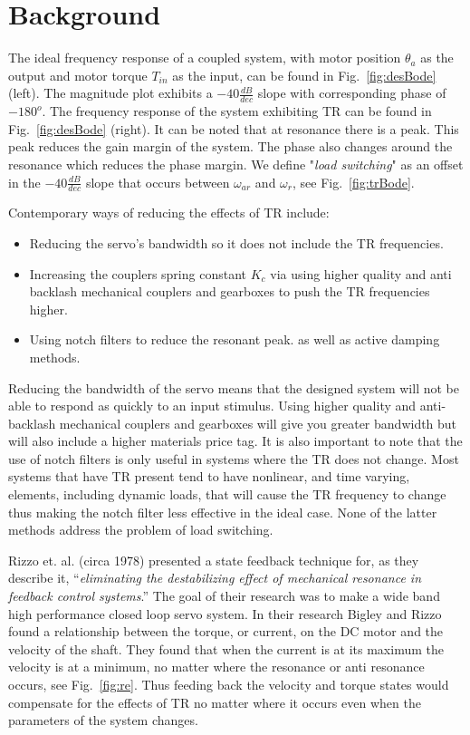 \section{Background}\label{sec:back}
The ideal frequency response of a coupled system, with motor position $\theta_a$ as the output and motor torque $T_{in}$ as the input, can be found in Fig.~\ref{fig:desBode} (left). 
The magnitude plot exhibits a $-40\frac{dB}{dec}$ slope with corresponding phase of $-180^o$.
The frequency response of the system exhibiting TR can be found in Fig.~\ref{fig:desBode} (right). 
It can be noted that at resonance there is a peak. This peak reduces the gain margin of the system. The phase also changes around the resonance which reduces the phase margin.  
We define "\textit{load switching}" as an offset in the $-40\frac{dB}{dec}$ slope that occurs between $\omega_{ar}$ and $\omega_r$, see Fig.~\ref{fig:trBode}.

Contemporary ways of reducing the effects of TR include:
\begin{itemize}
\item Reducing the servo's bandwidth so it does not include the TR frequencies. 
\item Increasing the couplers spring constant $K_c$ via using higher quality and anti backlash mechanical couplers and gearboxes to push the TR frequencies higher. 
\item Using notch filters to reduce the resonant peak. as well as active damping methods\cite{5730488}.   
\end{itemize}

Reducing the bandwidth of the servo means that the designed system will not be able to respond as quickly to an input stimulus. Using higher quality and anti-backlash mechanical couplers and gearboxes will give you greater bandwidth but will also include a higher materials price tag. It is also important to note that the use of notch filters is only useful in systems where the TR does not change. Most systems that have TR present tend to have nonlinear, and time varying, elements, including dynamic loads, that will cause the TR frequency to change thus making the notch filter less effective in the ideal case.  None of the latter methods address the problem of load switching.

Rizzo et. al.\cite{bigley1978resonance} (circa 1978) presented a state feedback technique for, as they describe it, ``\textit{eliminating the destabilizing effect of mechanical resonance in feedback control systems}.''  The goal of their research was to make a wide band high performance closed loop servo system. In their research Bigley and Rizzo found a relationship between the torque, or current, on the DC motor and the velocity of the shaft. They found that when the current is at its maximum the velocity is at a minimum, no matter where the resonance or anti resonance occurs, see Fig.~\ref{fig:re}. Thus feeding back the velocity and torque states would compensate for the effects of TR no matter where it occurs even when the parameters of the system changes.

